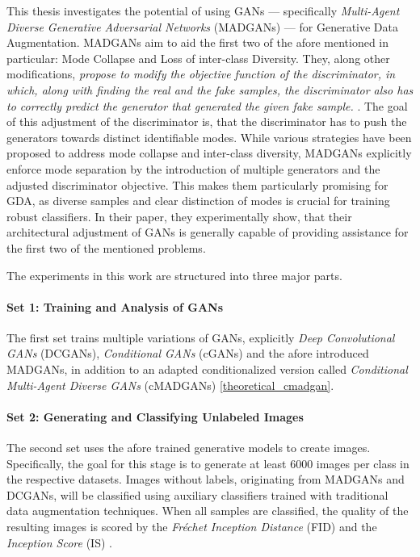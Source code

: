 This thesis investigates the potential of using GANs --- specifically \textit{Multi-Agent Diverse Generative Adversarial Networks} (MADGANs) \cite{ghosh2018madgan} --- for Generative Data Augmentation. MADGANs aim to aid the first two of the afore mentioned in particular: Mode Collapse and Loss of inter-class Diversity. They, along other modifications, \textit{propose to modify the objective function of the discriminator, in which, along with finding the real and the fake samples, the discriminator also has to correctly predict the generator that generated the given fake sample.} \cite{ghosh2018madgan}. The goal of this adjustment of the discriminator is, that the discriminator has to push the generators towards distinct identifiable modes. While various strategies have been proposed to address mode collapse and inter-class diversity, MADGANs explicitly enforce mode separation by the introduction of multiple generators and the adjusted discriminator objective. This makes them particularly promising for GDA, as diverse samples and clear distinction of modes is crucial for training robust classifiers. In their paper, they experimentally show, that their architectural adjustment of GANs is generally capable of providing assistance for the first two of the mentioned problems.

The experiments in this work are structured into three major parts.

\paragraph{Set 1: Training and Analysis of GANs}  \label{thesis_goal_1}
The first set trains multiple variations of GANs, explicitly \textit{Deep Convolutional GANs} (DCGANs), \textit{Conditional GANs} (cGANs) and the afore introduced MADGANs, in addition to an adapted conditionalized version called \textit{Conditional Multi-Agent Diverse GANs} (cMADGANs) \ref{theoretical_cmadgan}. 

\paragraph{Set 2: Generating and Classifying Unlabeled Images}  \label{thesis_goal_2}
The second set uses the afore trained generative models to create images. Specifically, the goal for this stage is to generate at least $6 000$ images per class in the respective datasets. Images without labels, originating from MADGANs and DCGANs, will be classified using auxiliary classifiers trained with traditional data augmentation techniques. When all samples are classified, the quality of the resulting images is scored by the \textit{Fréchet Inception Distance} (FID) \cite{heusel2018ganstrainedtimescaleupdate} and the \textit{Inception Score} (IS) \cite{salimans2016improvedtechniquestraininggans}.

